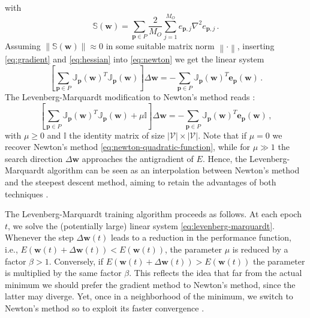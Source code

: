 \documentclass{elsarticle}
\numberwithin{equation}{section}
\theoremstyle{theorem}
\theoremstyle{definition}
\theoremstyle{remark}
\theoremstyle{proposition}
\numberwithin{figure}{section}
\newcommand{\norm}[1]{\left\lVert#1\right\rVert}
\begin{document}
		with
		\begin{equation*}
			\mathbb{S}(\mathbf{w}) = \sum_{\mathbf{p} \in P} \dfrac{2}{M_O} \sum_{j = 1}^{M_O} e_{\mathbf{p},j} \nabla^2 e_{\mathbf{p},j} \, .
		\end{equation*}
		Assuming $\norm{\mathbb{S}(\mathbf{w})} \approx 0$ in some suitable matrix norm $\norm{\cdot}$, inserting \eqref{eq:gradient} and \eqref{eq:hessian} into \eqref{eq:newton} we get the linear system
		\begin{equation}
			\label{eq:newton-quadratic-function}
			\left[ \sum_{\mathbf{p} \in P} \mathbb{J}_{\mathbf{p}}(\mathbf{w})^T \mathbb{J}_{\mathbf{p}}(\mathbf{w}) \right] \Delta \mathbf{w} = - \sum_{\mathbf{p} \in P} \mathbb{J}_{\mathbf{p}}(\mathbf{w})^T \mathbf{e}_{\mathbf{p}}(\mathbf{w}) \, .
		\end{equation} 
		The Levenberg-Marquardt modification to Newton's method reads \cite{Hag94, Mar63}:
		\begin{equation}
			\label{eq:levenberg-marquardt}
			\left[ \sum_{\mathbf{p} \in P} \mathbb{J}_{\mathbf{p}}(\mathbf{w})^T \mathbb{J}_{\mathbf{p}}(\mathbf{w}) + \mu \mathbb{I} \right] \Delta \mathbf{w} = - \sum_{\mathbf{p} \in P} \mathbb{J}_{\mathbf{p}}(\mathbf{w})^T \mathbf{e}_{\mathbf{p}}(\mathbf{w}) \, ,
		\end{equation}
		with $\mu \geq 0$ and $\mathbb{I}$ the identity matrix of size $|\mathcal{V}| \times |\mathcal{V}|$. Note that if $\mu = 0$ we recover Newton's method \eqref{eq:newton-quadratic-function}, while for $\mu \gg 1$ the search direction $\Delta \mathbf{w}$ approaches the antigradient of $E$. Hence, the Levenberg-Marquardt algorithm can be seen as an interpolation between Newton's method and the steepest descent method, aiming to retain the advantages of both techniques \cite{Hag94}.
		
		The Levenberg-Marquardt training algorithm proceeds as follows. At each epoch $t$, we solve the (potentially large) linear system \eqref{eq:levenberg-marquardt}. Whenever the step $\Delta \mathbf{w}(t)$ leads to a reduction in the performance function, i.e., $E(\mathbf{w}(t) + \Delta \mathbf{w}(t)) < E(\mathbf{w}(t))$, the parameter $\mu$ is reduced by a factor $\beta > 1$. Conversely, if $E(\mathbf{w}(t) + \Delta \mathbf{w}(t)) > E(\mathbf{w}(t))$ the parameter is multiplied by the same factor $\beta$. This reflects the idea that far from the actual minimum we should prefer the gradient method to Newton's method, since the latter may diverge. Yet, once in a neighborhood of the minimum, we switch to Newton's method so to exploit its faster convergence \cite{Mar63}.
		
\end{document}
